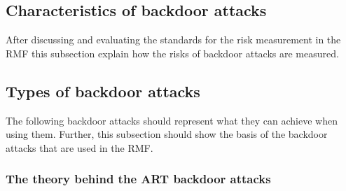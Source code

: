 \subsection{Characteristics of backdoor attacks}

After discussing and evaluating the standards for the risk measurement in the RMF this subsection explain how the risks of backdoor attacks are measured.

\subsection{Types of backdoor attacks}

The following backdoor attacks should represent what they can achieve when using them. Further, this subsection should show the basis of the backdoor attacks that are used in the RMF.

\subsubsection*{The theory behind the ART backdoor attacks}

